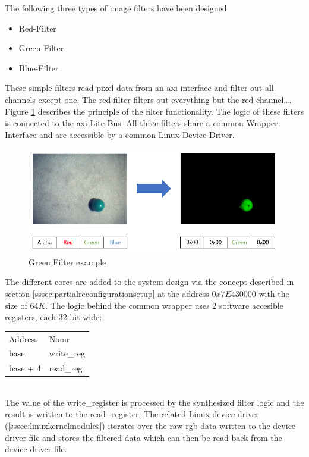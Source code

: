 The following three types of image filters have been designed:
\begin{itemize}
\item Red-Filter
\item Green-Filter
\item Blue-Filter
\end{itemize}
These simple filters read pixel data from an \gls{axi} interface and filter out
all channels except one.
The red filter filters out everything but the red channel\ldots.
Figure \ref{fig:imagefilter} describes the principle of the filter
functionality.
The logic of these filters is connected to the \gls{axi}-Lite Bus.
All three filters share a common Wrapper-Interface and are accessible by a
common Linux-Device-Driver.\\
\begin{figure}[h]
\centering
\includegraphics[width=1\textwidth]{sections/methodology/ImageFilter.PNG}
\caption{\label{fig:imagefilter} Green Filter example}
\end{figure}
The different cores are added to the system design via the concept described in
section \ref{sssec:partialreconfigurationsetup} at the address $0x7E430000$ with
the size of $64K$.
The logic behind the common wrapper uses 2 software accesible registers, each
32-bit wide:\\
\begin{tabular}{ll}
	Address & Name \\
	base     & write\_reg\\
	base + 4 & read\_reg\\
\end{tabular}\\
The value of the write\_register is processed by the synthesized filter logic
and the result is written to the read\_register.
The related Linux device driver (\ref{sssec:linuxkernelmodules}) iterates over
the raw \gls{rgb} data written to the device driver file and stores the filtered
data which can then be read back from the device driver file.
